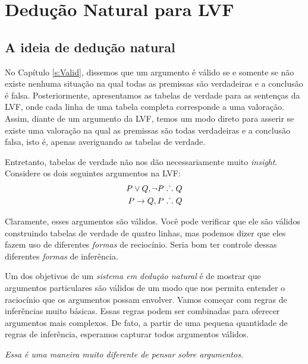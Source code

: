 \part{Dedu\c c\~ao Natural para LVF}
\label{ch.NDTFL}

\chapter{A ideia de dedu\c c\~ao natural}\label{s:NDVeryIdea}

No  Cap\'itulo  \ref{s:Valid}, dissemos que um argumento \'e v\'alido se e somente se n\~ao existe nenhuma situa\c c\~ao na qual todas as premissas s\~ao verdadeiras e a conclus\~ao \'e falsa. Posteriormente,  apresentamos as tabelas de verdade para as senten\c cas da LVF,  onde  cada linha de uma tabela completa corresponde a uma valora\c c\~ao. Assim, diante de um argumento da LVF,  temos um modo direto para asserir se existe uma valora\c c\~ao na qual as premissas s\~ao todas verdadeiras e a conclus\~ao falsa, isto \'e, apenas averiguando as tabelas de verdade. 

Entretanto, tabelas de verdade n\~ao nos d\~ao necessariamente muito  \emph{insight}. Considere os dois seguintes argumentos na LVF:
\begin{align*}
P \vee Q, \neg P & \mathrel{\ldotp\dot{}\,\ldotp} Q\\
P \rightarrow Q, P & \mathrel{\ldotp\dot{}\,\ldotp} Q
\end{align*}

Claramente, esses argumentos s\~ao v\'alidos. Voc\^e  pode verificar que ele s\~ao v\'alidos construindo tabelas de verdade de quatro linhas, mas podemos dizer que eles fazem uso de diferentes \emph{formas}  de recioc\'inio. Seria bom ter controle dessas diferentes \emph{formas}  de infer\^encia.

Um dos  objetivos de um  \emph{sistema em dedu\c c\~ao natural} \'e de mostrar que argumentos particulares s\~ao  v\'alidos de um modo que nos permita entender o racioc\'inio que os argumentos possam envolver.  Vamos come\c car com regras de infer\^encias muito b\'asicas. Essas regras podem ser combinadas para oferecer  argumentos mais complexos.  De fato,  a partir de uma pequena quantidade  de regras de infer\^encia, esperamos capturar todos argumentos v\'alidos.


\emph{Essa \'e uma maneira muito diferente de pensar sobre argumentos.} 

